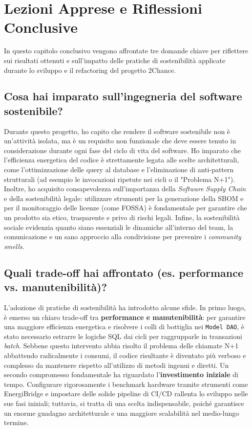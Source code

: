 \chapter{Lezioni Apprese e Riflessioni Conclusive}

In questo capitolo conclusivo vengono affrontate tre domande chiave per riflettere sui risultati ottenuti e sull'impatto delle pratiche di sostenibilità applicate durante lo sviluppo e il refactoring del progetto 2Chance.

\section*{Cosa hai imparato sull'ingegneria del software sostenibile?}
Durante questo progetto, ho capito che rendere il software sostenibile non è un'attività isolata, ma è un requisito non funzionale che deve essere tenuto in considerazione durante ogni fase del ciclo di vita del software. Ho imparato che l'efficienza energetica del codice è strettamente legata alle scelte architetturali, come l'ottimizzazione delle query al database e l'eliminazione di anti-pattern strutturali (ad esempio le invocazioni ripetute nei cicli o il "Problema N+1"). Inoltre, ho acquisito consapevolezza sull'importanza della \textit{Software Supply Chain} e della sostenibilità legale: utilizzare strumenti per la generazione della SBOM e per il monitoraggio delle licenze (come FOSSA) è fondamentale per garantire che un prodotto sia etico, trasparente e privo di rischi legali. Infine, la sostenibilità sociale evidenzia quanto siano essenziali le dinamiche all'interno del team, la comunicazione e un sano approccio alla condivisione per prevenire i \textit{community smells}.

\section*{Quali trade-off hai affrontato (es. performance vs. manutenibilità)?}
L'adozione di pratiche di sostenibilità ha introdotto alcune sfide. In primo luogo, è emerso un chiaro trade-off tra \textbf{performance e manutenibilità}: per garantire una maggiore efficienza energetica e risolvere i colli di bottiglia nei \texttt{Model DAO}, è stato necessario estrarre le logiche SQL dai cicli per raggrupparle in transazioni \textit{batch}. Sebbene questo intervento abbia risolto il problema delle chiamate N+1 abbattendo radicalmente i consumi, il codice risultante è diventato più verboso e complesso da mantenere rispetto all'utilizzo di metodi ingenui e diretti. Un secondo compromesso fondamentale ha riguardato l'\textbf{investimento iniziale} di tempo. Configurare rigorosamente i benchmark hardware tramite strumenti come EnergiBridge e impostare delle solide pipeline di CI/CD rallenta lo sviluppo nelle sue fasi iniziali; tuttavia, si tratta di una scelta indispensabile, poiché garantisce un enorme guadagno architetturale e una maggiore scalabilità nel medio-lungo termine.

